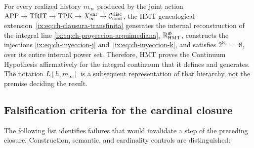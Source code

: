 \begin{theorem}
\label{ix:thm:decision-continuo-hmt}
For every realized history
\(m_\infty\) produced by the joint action
\(\mathrm{APP}\to\mathrm{TRIT}\to\mathrm{TPK}\to
X_\infty^{\rm enr}\to\mathcal C_{\rm cont}^{\rm disc}\), the HMT genealogical
extension~\eqref{ix:eq:ch-clausura-transfinita} generates the internal
reconstruction of the integral line
\eqref{ix:eq:ch-proyeccion-arquimediana},
\(\mathbb R_{\rm HMT}^{\mathfrak G}\), constructs the injections
\eqref{ix:eq:ch-inyeccion-j} and~\eqref{ix:eq:ch-inyeccion-k}, and satisfies
\(2^{\aleph_0}=\aleph_1\) over its entire internal power set. Therefore, HMT
proves the Continuum Hypothesis affirmatively for the integral continuum that
it defines and generates. The notation \(L[h,m_\infty]\) is a subsequent
representation of that hierarchy, not the premise deciding the result.
\end{theorem}


\subsection{Falsification criteria for the cardinal closure}

The following list identifies failures that would invalidate a step of the
preceding closure. Construction, semantic, and cardinality controls are
distinguished:

